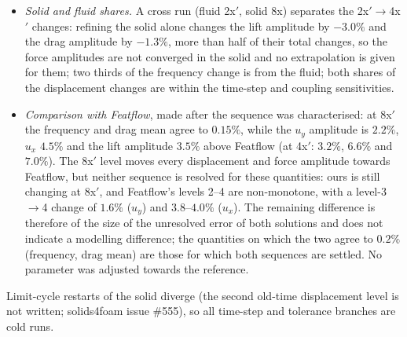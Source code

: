 \begin{itemize}
	\item \emph{Solid and fluid shares.} A cross run (fluid 2x$'$, solid 8x) separates the 2x$'\to$4x$'$ changes: refining the solid alone changes the lift amplitude by $-3.0\%$ and the drag amplitude by $-1.3\%$, more than half of their total changes, so the force amplitudes are not converged in the solid and no extrapolation is given for them; two thirds of the frequency change is from the fluid; both shares of the displacement changes are within the time-step and coupling sensitivities.
	\item \emph{Comparison with Featflow}, made after the sequence was characterised: at 8x$'$ the frequency and drag mean agree to $0.15\%$, while the $u_y$ amplitude is $2.2\%$, $u_x$ $4.5\%$ and the lift amplitude $3.5\%$ above Featflow (at 4x$'$: $3.2\%$, $6.6\%$ and $7.0\%$). The 8x$'$ level moves every displacement and force amplitude towards Featflow, but neither sequence is resolved for these quantities: ours is still changing at 8x$'$, and Featflow's levels 2--4 are non-monotone, with a level-3$\to$4 change of $1.6\%$ ($u_y$) and $3.8$--$4.0\%$ ($u_x$). The remaining difference is therefore of the size of the unresolved error of both solutions and does not indicate a modelling difference; the quantities on which the two agree to $0.2\%$ (frequency, drag mean) are those for which both sequences are settled. No parameter was adjusted towards the reference.
\end{itemize}
Limit-cycle restarts of the solid diverge (the second old-time displacement level is not written; solids4foam issue \#555), so all time-step and tolerance branches are cold runs.

